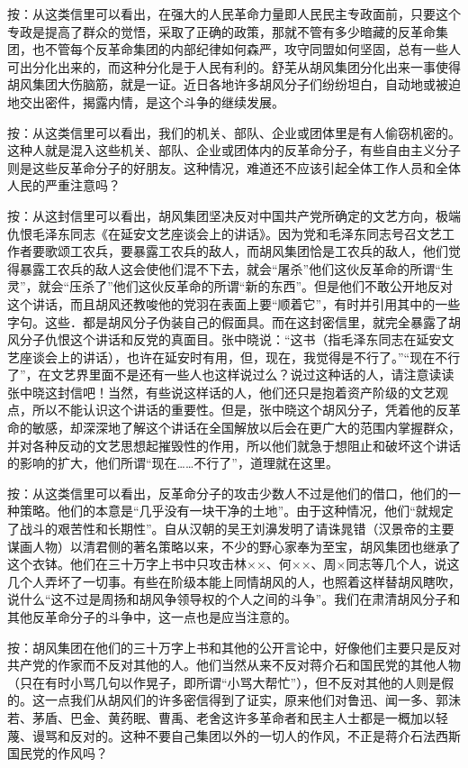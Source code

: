按：从这类信里可以看出，在强大的人民革命力量即人民民主专政面前，只要这个专政是提高了群众的觉悟，采取了正确的政策，那就不管有多少暗藏的反革命集团，也不管每个反革命集团的内部纪律如何森严，攻守同盟如何坚固，总有一些人可出分化出来的，而这种分化是于人民有利的。舒芜从胡风集团分化出来一事使得胡风集团大伤脑筋，就是一证。近日各地许多胡风分子们纷纷坦白，自动地或被迫地交出密件，揭露内情，是这个斗争的继续发展。

按：从这类信里可以看出，我们的机关、部队、企业或团体里是有人偷窃机密的。这种人就是混入这些机关、部队、企业或团体内的反革命分子，有些自由主义分子则是这些反革命分子的好朋友。这种情况，难道还不应该引起全体工作人员和全体人民的严重注意吗？

按：从这封信里可以看出，胡风集团坚决反对中国共产党所确定的文艺方向，极端仇恨毛泽东同志《在延安文艺座谈会上的讲话》。因为党和毛泽东同志号召文艺工作者要歌颂工农兵，要暴露工农兵的敌人，而胡风集团恰是工农兵的敌人，他们觉得暴露工农兵的敌人这会使他们混不下去，就会“屠杀”他们这伙反革命的所谓“生灵”，就会“压杀了”他们这伙反革命的所谓“新的东西”。但是他们不敢公开地反对这个讲话，而且胡风还教唆他的党羽在表面上要“顺着它”，有时并引用其中的一些字句。这些．都是胡风分子伪装自己的假面具。而在这封密信里，就完全暴露了胡风分子仇恨这个讲话和反党的真面目。张中晓说：“这书（指毛泽东同志在延安文艺座谈会上的讲话），也许在延安时有用，但，现在，我觉得是不行了。”“现在不行了”，在文艺界里面不是还有一些人也这样说过么？说过这种话的人，请注意读读张中晓这封信吧！当然，有些说这样话的人，他们还只是抱着资产阶级的文艺观点，所以不能认识这个讲话的重要性。但是，张中晓这个胡风分子，凭着他的反革命的敏感，却深深地了解这个讲话在全国解放以后会在更广大的范围内掌握群众，并对各种反动的文艺思想起摧毁性的作用，所以他们就急于想阻止和破坏这个讲话的影响的扩大，他们所谓“现在……不行了”，道理就在这里。

按：从这类信里可以看出，反革命分子的攻击少数人不过是他们的借口，他们的一种策略。他们的本意是“几乎没有一块干净的土地”。由于这种情况，他们“就规定了战斗的艰苦性和长期性”。自从汉朝的吴王刘濞发明了请诛晁错（汉景帝的主要谋画人物）以清君侧的著名策略以来，不少的野心家奉为至宝，胡风集团也继承了这个衣钵。他们在三十万字上书中只攻击林××、何××、周×同志等几个人，说这几个人弄坏了一切事。有些在阶级本能上同情胡风的人，也照着这样替胡风瞎吹，说什么“这不过是周扬和胡风争领导权的个人之间的斗争”。我们在肃清胡风分子和其他反革命分子的斗争中，这一点也是应当注意的。

按：胡风集团在他们的三十万字上书和其他的公开言论中，好像他们主要只是反对共产党的作家而不反对其他的人。他们当然从来不反对蒋介石和国民党的其他人物（只在有时小骂几句以作晃子，即所谓“小骂大帮忙”），但不反对其他的人则是假的。这一点我们从胡风们的许多密信得到了证实，原来他们对鲁迅、闻一多、郭沬若、茅盾、巴金、黄药眠、曹禹、老舍这许多革命者和民主人士都是一概加以轻蔑、谩骂和反对的。这种不要自己集团以外的一切人的作风，不正是蒋介石法西斯国民党的作风吗？

